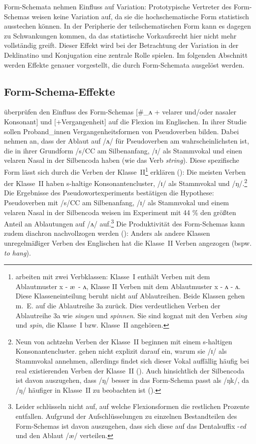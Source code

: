 Form-Schemata nehmen Einfluss auf Variation: Prototypische Vertreter des Form-Schemas weisen keine Variation auf, da sie die hochschematische Form statistisch ausstechen können. In der Peripherie der teilschematischen Form kann es dagegen zu Schwankungen kommen, da das statistische Vorkaufsrecht hier nicht mehr vollständig greift. Dieser Effekt wird bei der Betrachtung der Variation in der Deklinatino und Konjugation eine zentrale Rolle spielen. Im folgenden Abschnitt werden Effekte genauer vorgestellt, die durch Form-Schemata ausgelöst werden.

\subsection{Form-Schema-Effekte}
\label{schemaeffekt}

\textcite{Bybee.1983} überprüfen den Einfluss des Form-Schemas [\#\_ʌ + velarer und\slash oder nasaler Konsonant] und [+Vergangenheit] auf die Flexion im Englischen. In ihrer Studie sollen Proband\_innen Vergangenheitsformen von Pseudoverben bilden. Dabei nehmen \textcite{Bybee.1983} an, dass der Ablaut auf /ʌ/ für Pseudoverben am wahrscheinlichsten ist, die in ihrer Grundform /s/CC am Silbenanfang, /ɪ/ als Stammvokal und einen velaren Nasal in der Silbencoda haben (wie das Verb \textit{string}).  Diese spezifische Form lässt sich durch die Verben der Klasse~II\footnote{\textcite[252]{Bybee.1983} arbeiten mit zwei Verbklassen: Klasse~I enthält Verben mit dem Ablautmuster x - \ae\ - ʌ, Klasse II Verben mit dem Ablautmuster x - ʌ - ʌ. Diese Klasseneinteilung beruht nicht auf Ablautreihen. Beide Klassen gehen m.~E. auf die Ablautreihe 3a zurück. Dies verdeutlichen Verben der Ablautreihe 3a wie \textit{singen} und \textit{spinnen}. Sie sind kognat mit den Verben \textit{sing} und \textit{spin}, die Klasse~I bzw. Klasse~II angehören.} erklären (\cite[257--258]{Bybee.1983}): Die meisten Verben der Klasse~II haben s-haltige Konsonantencluster, /ɪ/ als Stammvokal und /ŋ/.\footnote{Neun von achtzehn Verben der Klasse~II beginnen mit einem s-haltigen Konsonantencluster. \textcite{Bybee.1983} gehen nicht explizit darauf ein, warum sie /ɪ/ als Stammvokal annehmen, allerdings findet sich dieser Vokal auffällig häufig bei real existierenden Verben der Klasse~II (\cite[252]{Bybee.1983}). Auch hinsichtlich der Silbencoda ist davon auszugehen, dass /ŋ/ besser in das Form-Schema passt als /ŋk/, da /ŋ/ häufiger in Klasse~II zu beobachten ist (\cite[257]{Bybee.1983}).} Die Ergebnisse des Pseudowortexperiments bestätigen die Hypothese: Pseudoverben mit /s/CC am Silbenanfang, /ɪ/ als Stammvokal und einem velaren Nasal in der Silbencoda weisen im Experiment mit 44 \% den größten Anteil an Ablautungen auf /ʌ/ auf.\footnote{Leider schlüsseln \textcite{Bybee.1983} nicht auf, auf welche Flexionsformen die restlichen Prozente entfallen. Aufgrund der Aufschlüsselungen zu einzelnen Bestandteilen des Form-Schemas ist davon auszugehen, dass sich diese auf das Dentalsuffix -\textit{ed} und den Ablaut /\ae/ verteilen.} Die Produktivität des Form-Schemas kann zudem diachron nachvollzogen werden (\cite[263, 265--266]{Bybee.1983}): Anders als andere Klassen unregelmäßiger Verben des Englischen hat die Klasse~II Verben angezogen (bspw. \textit{to hang}).  

